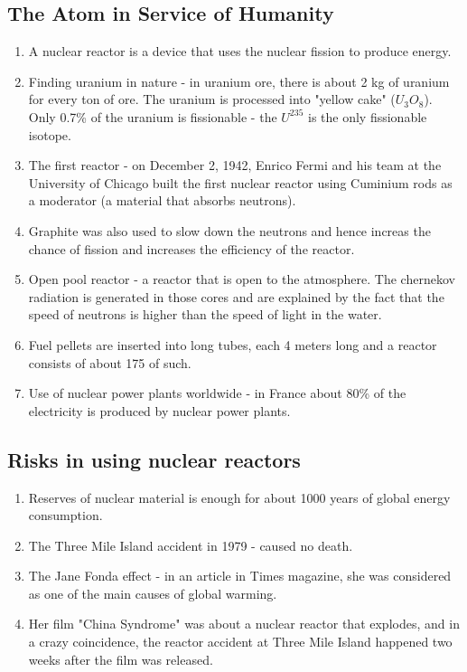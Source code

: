 \documentclass[11pt]{article}
\begin{document}
\subsection{The Atom in Service of Humanity}
\begin{enumerate}
    \item A nuclear reactor is a device that uses the nuclear fission to produce energy.
    \item Finding uranium in nature - in uranium ore, there is about 2 kg of uranium for every ton of ore. The uranium is processed into "yellow cake" ($U_3 O_8$). Only 0.7\% of the uranium is fissionable - the $U^{235}$ is the only fissionable isotope.
    \item The first reactor - on December 2, 1942, Enrico Fermi and his team at the University of Chicago built the first nuclear reactor using Cuminium rods as a moderator (a material that absorbs neutrons).
    \item Graphite was also used to slow down the neutrons and hence increas the chance of fission and increases the efficiency of the reactor.
    \item Open pool reactor - a reactor that is open to the atmosphere. The chernekov radiation is generated in those cores and are explained by the fact that the speed of neutrons is higher than the speed of light in the water.
    \item Fuel pellets are inserted into long tubes, each 4 meters long and a reactor consists of about 175 of such.
    \item Use of nuclear power plants worldwide - in France about 80\% of the electricity is produced by nuclear power plants.
\end{enumerate}

\subsection{Risks in using nuclear reactors}
\begin{enumerate}
    \item Reserves of nuclear material is enough for about 1000 years of global energy consumption.
    \item The Three Mile Island accident in 1979 - caused no death.
    \item The Jane Fonda effect - in an article in Times magazine, she was considered as one of the main causes of global warming.
    \item Her film "China Syndrome" was about a nuclear reactor that explodes, and in a crazy coincidence, the reactor accident at Three Mile Island happened two weeks after the film was released.
\end{enumerate}
\end{document}
